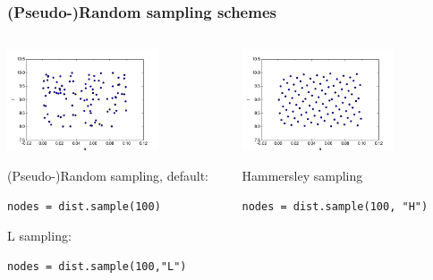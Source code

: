 \documentclass{beamer}
\begin{document}
  \begin{frame}[fragile]
 \frametitle{(Pseudo-)Random sampling schemes}
 \begin{columns}
     \begin{center}
                \includegraphics[width=0.7\textwidth]{samples.png}

                (Pseudo-)Random sampling, default:

                \scriptsize
                \verb;nodes = dist.sample(100);
                \normalsize

                L sampling:

                \scriptsize
                \verb;nodes = dist.sample(100,"L");
                \normalsize
     \end{center}
     \begin{center}
                \includegraphics[width=0.7\textwidth]{samples_M.png}

                Hammersley sampling

                \scriptsize
                \verb;nodes = dist.sample(100, "H");
                \normalsize
                

\end{center}
\end{columns}
\end{frame}
\end{document}
